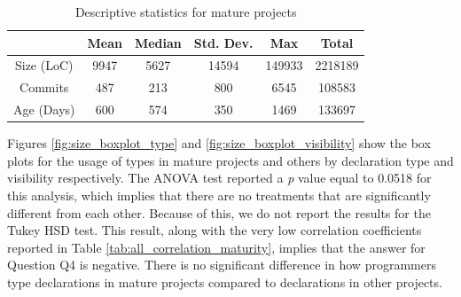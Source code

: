 \documentclass[msc]{ppgccufmg}
\renewcommand{\arraystretch}{1.2}
\begin{document}
\begin{table}[h!]

\centering{}%
\renewcommand{\arraystretch}{1.2}

\begin{tabular}{|c|c|c|c|c|c|}
\hline
{}		& Mean	& Median	& Std. Dev.	& Max	& Total		\\
\hline
\hline
Size (LoC)	& 9947 	& 5627 & 14594  & 149933	& 2218189	\\ \hline
Commits   	& 487  	& 213    & 800   & 6545		& 108583	\\ \hline
Age (Days)  & 600  	& 574  & 350   & 1469		& 133697	\\ \hline
\end{tabular}
\caption{Descriptive statistics for mature projects}
\label{tab:mature_dataset_characterization}
\end{table}

Figures \ref{fig:size_boxplot_type}  and \ref{fig:size_boxplot_visibility} show the box plots for the usage of types in mature projects and others by declaration type and visibility respectively.
The ANOVA test reported a \emph{p} value equal to 0.0518 for this analysis, which implies that there are no treatments that are significantly different from each other.
Because of this, we do not report the results for the Tukey HSD test.
This result, along with the very low correlation coefficients reported in Table \ref{tab:all_correlation_maturity}, implies that the answer for Question Q4 is negative.
There is no significant difference in how programmers type declarations in mature projects compared to declarations in other projects.
\end{document}
